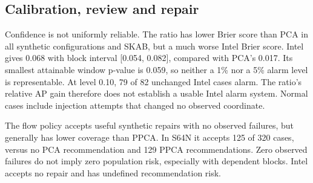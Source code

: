 \documentclass[conference]{IEEEtran}
\newcommand{\1}{\mathbf{1}}
\begin{document}
\subsection{Calibration, review and repair}
Confidence is not uniformly reliable. The ratio has lower Brier score than PCA in all synthetic configurations and SKAB, but a much worse Intel Brier score. Intel gives 0.068 with block interval [0.054, 0.082], compared with PCA's 0.017. Its smallest attainable window p-value is 0.059, so neither a 1\% nor a 5\% alarm level is representable. At level 0.10, 79 of 82 unchanged Intel cases alarm. The ratio's relative AP gain therefore does not establish a usable Intel alarm system. Normal cases include injection attempts that changed no observed coordinate.

The flow policy accepts useful synthetic repairs with no observed failures, but generally has lower coverage than PPCA. In S64N it accepts 125 of 320 cases, versus no PCA recommendation and 129 PPCA recommendations. Zero observed failures do not imply zero population risk, especially with dependent blocks. Intel accepts no repair and has undefined recommendation risk.
\end{document}
